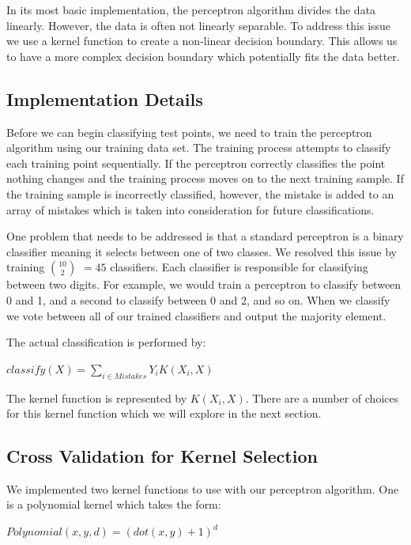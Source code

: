 \documentclass{article} %
\begin{document}
In its most basic implementation, the perceptron algorithm divides the data
linearly. However, the data is often not linearly separable. To address this
issue we use a kernel function to create a non-linear decision boundary. This
allows us to have a more complex decision boundary which potentially fits the
data better.

\subsection{Implementation Details}

Before we can begin classifying test points, we need to train the perceptron
algorithm using our training data set. The training process attempts
to classify each training point sequentially. If the perceptron correctly
classifies the point nothing changes and the training process moves on to the
next training sample. If the training sample is incorrectly classified, however,
the mistake is added to an array of mistakes which is taken into consideration
for future classifications.

One problem that needs to be addressed is that a standard perceptron is a binary
classifier meaning it selects between one of two classes. We resolved this issue
by training $10 \choose 2$ $=45$ classifiers. Each classifier is responsible for
classifying between two digits. For example, we would train a perceptron to
classify between 0 and 1, and a second to classify between 0 and 2, and so
on. When we classify we vote between all of our trained classifiers and output
the majority element.

The actual classification is performed by:

\begin{center}
$classify(X) = \sum\limits_{i \in Mistakes}{Y_iK(X_i, X)}$
\end{center}

The kernel function is represented by $K(X_i, X)$. There are a number of choices
for this kernel function which we will explore in the next section.

\subsection{Cross Validation for Kernel Selection}

We implemented two kernel functions to use with our perceptron algorithm. One is
a polynomial kernel which takes the form:

\begin{center}
$Polynomial(x, y, d) = (dot(x, y) + 1)^d$
\end{center}
\end{document}
